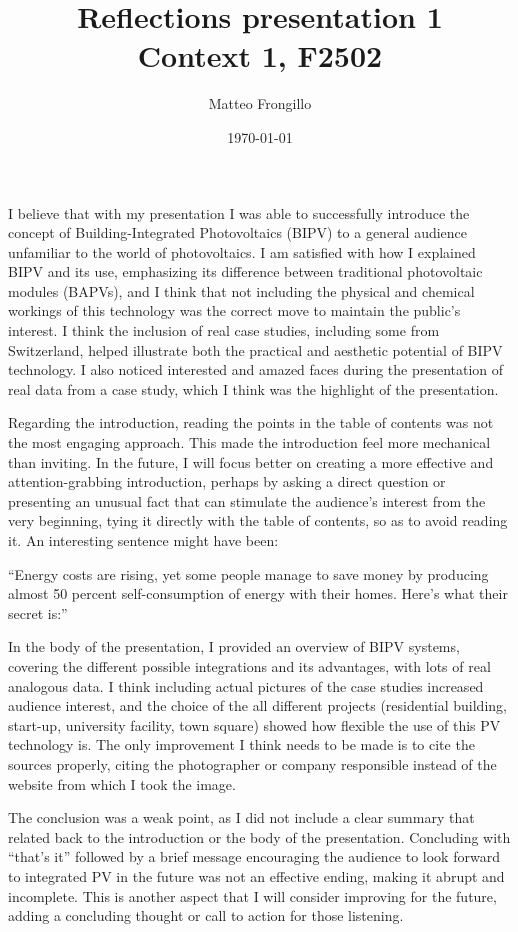 \documentclass{article}
\title{\textbf{Reflections presentation 1}\\\textbf{Context 1, F2502}}
\author{Matteo Frongillo}
\date{\today}
\begin{document}
\maketitle
{}
I believe that with my presentation I was able to successfully
introduce the concept of Building-Integrated Photovoltaics (BIPV) to
a general audience unfamiliar to the world of photovoltaics. I am
satisfied with how I explained BIPV and its use, emphasizing its
difference between traditional photovoltaic modules (BAPVs), and I
think that not including the physical and chemical workings of this
technology was the correct move to maintain the public's interest. I
think the inclusion of real case studies, including some from
Switzerland, helped illustrate both the practical and aesthetic
potential of BIPV technology. I also noticed interested and amazed
faces during the presentation of real data from a case study, which I
think was the highlight of the presentation.

Regarding the introduction, reading the points in the table of
contents was not the most engaging approach. This made the
introduction feel more mechanical than inviting. In the future,
I will focus better on creating a more effective and
attention-grabbing introduction, perhaps by asking a direct question
or presenting an unusual fact that can stimulate the audience's
interest from the very beginning, tying it directly with the table of
contents, so as to avoid reading it. An interesting sentence might
have been:

``Energy costs are rising, yet some people manage to save
money by producing almost 50 percent self-consumption of energy with
their homes. Here's what their secret is:''

In the body of the presentation, I provided an overview of BIPV
systems, covering the different possible integrations and its
advantages, with lots of real analogous data. I think including
actual pictures of the case studies increased audience
interest, and the choice of the all different
projects (residential building, start-up, university facility, town
square) showed how flexible the use of this PV technology is. The only
improvement I think needs to be made is to cite the sources properly,
citing the photographer or company responsible instead of the website
from which I took the image.

The conclusion was a weak point, as I did not include a clear summary
that related back to the introduction or the body of the presentation.
Concluding with “that's it” followed by a brief message encouraging the
audience to look forward to integrated PV in the future was not an
effective ending, making it abrupt and incomplete. This is another
aspect that I will consider improving for the future, adding a
concluding thought or call to action for those listening.
\end{document}
